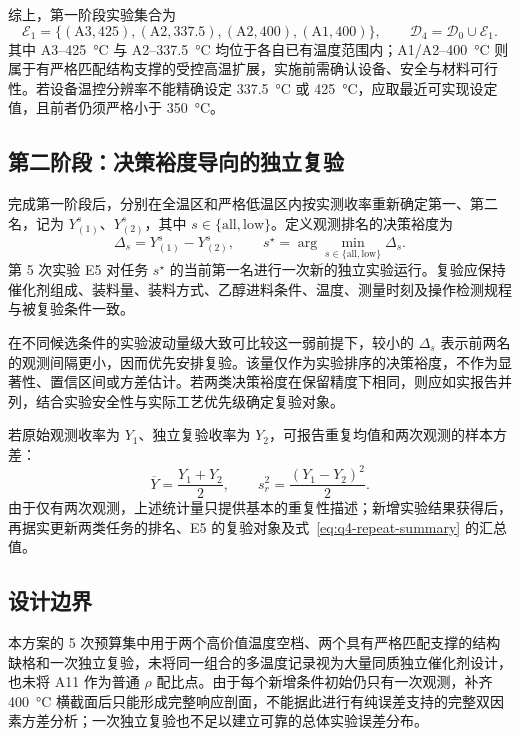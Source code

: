 


综上，第一阶段实验集合为
\begin{equation}
  \mathcal{E}_{1}=\{(\mathrm{A3},425),(\mathrm{A2},337.5),(\mathrm{A2},400),(\mathrm{A1},400)\},
  \qquad
  \mathcal{D}_{4}=\mathcal{D}_{0}\cup\mathcal{E}_{1}.
  \label{eq:q4-phase-one}
\end{equation}
其中 A3--\SI{425}{\degreeCelsius} 与 A2--\SI{337.5}{\degreeCelsius} 均位于各自已有温度范围内；A1/A2--\SI{400}{\degreeCelsius} 则属于有严格匹配结构支撑的受控高温扩展，实施前需确认设备、安全与材料可行性。若设备温控分辨率不能精确设定 \SI{337.5}{\degreeCelsius} 或 \SI{425}{\degreeCelsius}，应取最近可实现设定值，且前者仍须严格小于 \SI{350}{\degreeCelsius}。

\subsection{第二阶段：决策裕度导向的独立复验}

完成第一阶段后，分别在全温区和严格低温区内按实测收率重新确定第一、第二名，记为 $Y^{s}_{(1)}$、$Y^{s}_{(2)}$，其中 $s\in\{\mathrm{all},\mathrm{low}\}$。定义观测排名的决策裕度为
\begin{equation}
  \Delta_s=Y^{s}_{(1)}-Y^{s}_{(2)},
  \qquad
  s^{\star}=\arg\min_{s\in\{\mathrm{all},\mathrm{low}\}}\Delta_s.
  \label{eq:q4-margin}
\end{equation}
第 5 次实验 E5 对任务 $s^{\star}$ 的当前第一名进行一次新的独立实验运行。复验应保持催化剂组成、装料量、装料方式、乙醇进料条件、温度、测量时刻及操作检测规程与被复验条件一致。

在不同候选条件的实验波动量级大致可比较这一弱前提下，较小的 $\Delta_s$ 表示前两名的观测间隔更小，因而优先安排复验。该量仅作为实验排序的决策裕度，不作为显著性、置信区间或方差估计。若两类决策裕度在保留精度下相同，则应如实报告并列，结合实验安全性与实际工艺优先级确定复验对象。

若原始观测收率为 $Y_1$、独立复验收率为 $Y_2$，可报告重复均值和两次观测的样本方差：
\begin{equation}
  \overline{Y}=\frac{Y_1+Y_2}{2},
  \qquad
  s_r^2=\frac{(Y_1-Y_2)^2}{2}.
  \label{eq:q4-repeat-summary}
\end{equation}
由于仅有两次观测，上述统计量只提供基本的重复性描述；新增实验结果获得后，再据实更新两类任务的排名、E5 的复验对象及式~\eqref{eq:q4-repeat-summary} 的汇总值。

\subsection{设计边界}

本方案的 5 次预算集中用于两个高价值温度空档、两个具有严格匹配支撑的结构缺格和一次独立复验，未将同一组合的多温度记录视为大量同质独立催化剂设计，也未将 A11 作为普通 $\rho$ 配比点。由于每个新增条件初始仍只有一次观测，补齐 \SI{400}{\degreeCelsius} 横截面后只能形成完整响应剖面，不能据此进行有纯误差支持的完整双因素方差分析；一次独立复验也不足以建立可靠的总体实验误差分布。
